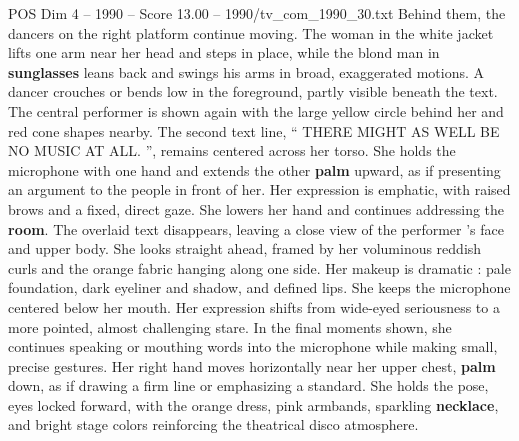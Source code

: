\begin{textsample}{POS Dim 4 – 1990 – Score 13.00 – 1990/tv\_com\_1990\_30.txt}
Behind them, the dancers on the right platform continue moving.
The woman in the white jacket lifts one arm near her head and steps in place, while the blond man in \textbf{sunglasses} leans back and swings his arms in broad, exaggerated motions.
A dancer crouches or bends low in the foreground, partly visible beneath the text.
The central performer is shown again with the large yellow circle behind her and red cone shapes nearby.
The second text line, “ THERE MIGHT AS WELL BE NO MUSIC AT ALL. ”, remains centered across her torso.
She holds the microphone with one hand and extends the other \textbf{palm} upward, as if presenting an argument to the people in front of her.
Her expression is emphatic, with raised brows and a fixed, direct gaze.
She lowers her hand and continues addressing the \textbf{room}.
The overlaid text disappears, leaving a close view of the performer ’s face and upper body.
She looks straight ahead, framed by her voluminous reddish curls and the orange fabric hanging along one side.
Her makeup is dramatic : pale foundation, dark eyeliner and shadow, and defined lips.
She keeps the microphone centered below her mouth.
Her expression shifts from wide-eyed seriousness to a more pointed, almost challenging stare.
In the final moments shown, she continues speaking or mouthing words into the microphone while making small, precise gestures.
Her right hand moves horizontally near her upper chest, \textbf{palm} down, as if drawing a firm line or emphasizing a standard.
She holds the pose, eyes locked forward, with the orange dress, pink armbands, sparkling \textbf{necklace}, and bright stage colors reinforcing the theatrical disco atmosphere.

\end{textsample}
